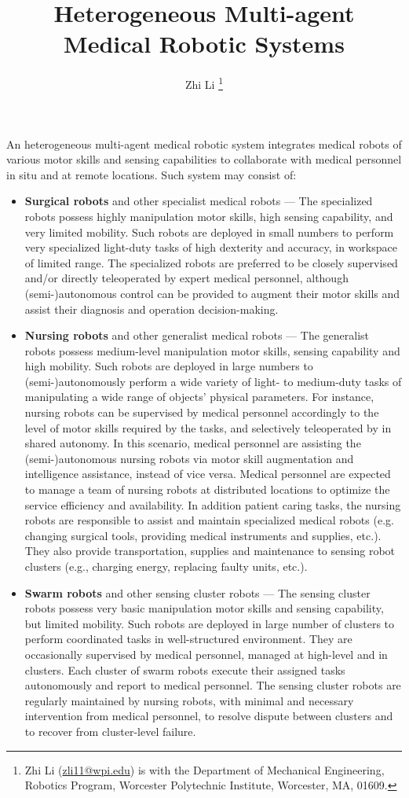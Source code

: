 \documentclass[11pt, peerreviewca, letterpaper, onecolumn]{article}
\title{Heterogeneous Multi-agent Medical Robotic Systems}
\author{Zhi Li \thanks{ Zhi Li (\protect\url{zli11@wpi.edu}) is with the Department of Mechanical Engineering, Robotics Program, Worcester Polytechnic Institute, Worcester, MA, 01609.}%

}
\begin{document}
\maketitle
\noindent
An heterogeneous multi-agent medical robotic system integrates medical robots of various motor skills and sensing capabilities to collaborate with medical personnel in situ and at remote locations. Such system may consist of: 

\begin{itemize}

\item \textbf{Surgical robots} and other specialist medical robots --- The specialized robots possess highly manipulation motor skills, high sensing capability, and very limited mobility. Such robots are deployed in small numbers to perform very specialized light-duty tasks of high dexterity and accuracy, in workspace of limited range. The specialized robots are preferred to be closely supervised and/or directly teleoperated by expert medical personnel, although (semi-)autonomous control can be provided to augment their motor skills and assist their diagnosis and operation decision-making. 

\item \textbf{Nursing robots} and other generalist medical robots --- The generalist robots possess medium-level manipulation motor skills, sensing capability and high mobility. Such robots are deployed in large numbers to (semi-)autonomously perform a wide variety of light- to medium-duty tasks of manipulating a wide range of objects’ physical parameters. For instance, nursing robots can be supervised by medical personnel accordingly to the level of motor skills required by the tasks, and selectively teleoperated by in shared autonomy. In this scenario, medical personnel are assisting the (semi-)autonomous nursing robots via motor skill augmentation and intelligence assistance, instead of vice versa. Medical personnel are expected to manage a team of nursing robots at distributed locations to optimize the service efficiency and availability. In addition patient caring tasks, the nursing robots are responsible to assist and maintain specialized medical robots (e.g. changing surgical tools, providing medical instruments and supplies, etc.). They also provide transportation, supplies and maintenance to sensing robot clusters (e.g., charging energy, replacing faulty units, etc.). 

\item \textbf{Swarm robots} and other sensing cluster robots --- The sensing cluster robots possess very basic manipulation motor skills and sensing capability, but limited mobility. Such robots are deployed in large number of clusters to perform coordinated tasks in well-structured environment. They are occasionally supervised by medical personnel, managed at high-level and in clusters. Each cluster of swarm robots execute their assigned tasks autonomously and report to medical personnel. The sensing cluster robots are regularly maintained by nursing robots, with minimal and necessary intervention from medical personnel, to resolve dispute between clusters and to recover from cluster-level failure. 

\end{itemize}
\end{document}
